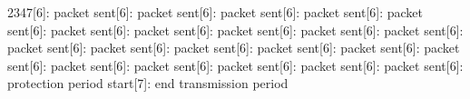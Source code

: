 \documentclass[parskip]{cs4rep}
\begin{document}
2347[6]: packet sent[6]: packet sent[6]: packet sent[6]: packet sent[6]: packet sent[6]: packet sent[6]: packet sent[6]: packet sent[6]: packet sent[6]: packet sent[6]: packet sent[6]: packet sent[6]: packet sent[6]: packet sent[6]: packet sent[6]: packet sent[6]: packet sent[6]: packet sent[6]: packet sent[6]: packet sent[6]: packet sent[6]: protection period start[7]: end transmission period\newline
\end{document}
